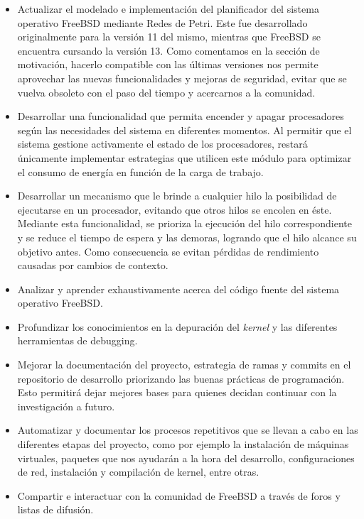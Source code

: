 \begin{itemize}
    \item Actualizar el modelado e implementación del planificador del sistema operativo FreeBSD mediante Redes de Petri. Este fue desarrollado originalmente para la versión 11 del mismo, mientras que FreeBSD se encuentra cursando la versión 13. Como comentamos en la sección de motivación, hacerlo compatible con las últimas versiones nos permite aprovechar las nuevas funcionalidades y mejoras de seguridad, evitar que se vuelva obsoleto con el paso del tiempo y acercarnos a la comunidad.
    \item Desarrollar una funcionalidad que permita encender y apagar procesadores según las necesidades del sistema en diferentes momentos. Al permitir que el sistema gestione activamente el estado de los procesadores, restará únicamente implementar estrategias que utilicen este módulo para optimizar el consumo de energía en función de la carga de trabajo.
    \item Desarrollar un mecanismo que le brinde a cualquier hilo la posibilidad de ejecutarse en un procesador, evitando que otros hilos se encolen en éste. Mediante esta funcionalidad, se prioriza la ejecución del hilo correspondiente y se reduce el tiempo de espera y las demoras, logrando que el hilo alcance su objetivo antes. Como consecuencia se evitan pérdidas de rendimiento causadas por cambios de contexto.
    \item Analizar y aprender exhaustivamente acerca del código fuente del sistema operativo FreeBSD.\@
    \item Profundizar los conocimientos en la depuración del \textit{kernel} y las diferentes herramientas de debugging.
    \item Mejorar la documentación del proyecto, estrategia de ramas y commits en el repositorio de desarrollo priorizando las buenas prácticas de programación. Esto permitirá dejar mejores bases para quienes decidan continuar con la investigación a futuro.
    \item Automatizar y documentar los procesos repetitivos que se llevan a cabo en las diferentes etapas del proyecto, como por ejemplo la instalación de máquinas virtuales, paquetes que nos ayudarán a la hora del desarrollo, configuraciones de red, instalación y compilación de kernel, entre otras.
    \item Compartir e interactuar con la comunidad de FreeBSD a través de foros y listas de difusión.
\end{itemize}

